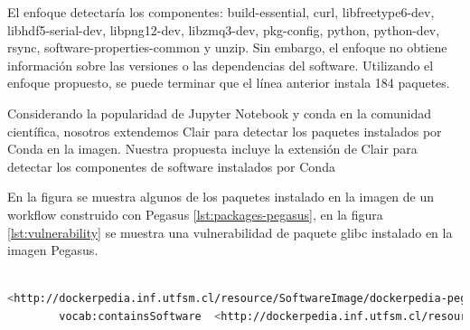 El enfoque detectaría los componentes: build-essential, curl, libfreetype6-dev, libhdf5-serial-dev, libpng12-dev, libzmq3-dev, pkg-config, python, python-dev, rsync, software-properties-common y unzip. Sin embargo, el enfoque no obtiene información sobre las versiones o las dependencias del software. Utilizando el  enfoque propuesto, se puede terminar que el línea anterior instala 184 paquetes.


Considerando la popularidad de Jupyter Notebook y conda en la comunidad científica, nosotros extendemos Clair para detectar los paquetes instalados por Conda en la imagen. Nuestra propuesta incluye la extensión de Clair para detectar los componentes de software instalados por Conda




En la figura se muestra algunos de los paquetes instalado en la imagen de un workflow construido con Pegasus \ref{lst:packages-pegasus}, en la figura \ref{lst:vulnerability} se muestra una vulnerabilidad de paquete glibc instalado en la imagen Pegasus.
\begin{lstlisting}[caption={Ejemplo de triples que muestran los componentes de software de la imagen Pegasus},label={lst:packages-pegasus},language=bash]

<http://dockerpedia.inf.utfsm.cl/resource/SoftwareImage/dockerpedia-pegasus_workflow_images%3Apegasus-4.8.5>
        vocab:containsSoftware  <http://dockerpedia.inf.utfsm.cl/resource/PackageVersion/libxcb-1.11.1-1ubuntu1>, <http://dockerpedia.inf.utfsm.cl/resource/PackageVersion/cryptsetup-2%3A1.6.6-5ubuntu2.1> , <http://dockerpedia.inf.utfsm.cl/resource/PackageVersion/e2fsprogs-1.42.13-1ubuntu1> , <http://dockerpedia.inf.utfsm.cl/resource/PackageVersion/dbus-glib-0.106-1> , <http://dockerpedia.inf.utfsm.cl/resource/PackageVersion/libxmu-2%3A1.1.2-2>
\end{lstlisting}


